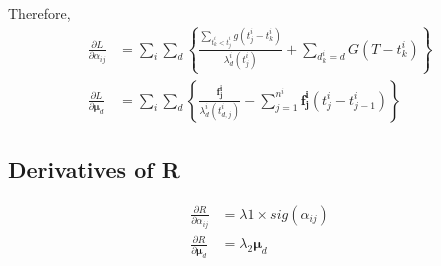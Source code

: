 \documentclass{article}
\begin{document}
			\newpage
			Therefore,
			\begin{equation}
			\begin{aligned}
			\frac{\partial L}{\partial\alpha_{ij}} &= \sum_{i} \sum_{d} \left\{\frac{\sum_{t_{k}^{i}<t_{j}^{i}} g\left(t_{j}^{i}-t_{k}^{i}\right)}{\lambda_{d}^{i}\left(t_{j}^{i}\right)} + \sum_{d^i_k = d}G\left(T - t^i_k\right) \right\} \\
			\frac{\partial L}{\partial\boldsymbol{\mu}_d} &=\sum_{i} \sum_{d}\left\{\frac{\boldsymbol{f^i_j}}{\lambda^i_d(t^i_{d,j})  }- \sum_{j=1}^{n^i} \boldsymbol{f^i_j }\left(t^i_j - t^i_{j-1}\right)  \right\}
			\end{aligned}
			\end{equation}
		
		\subsection{Derivatives of R}
			
			\begin{equation}
				\begin{aligned}
					\frac{\partial R}{\partial \alpha_{ij}} &= \lambda 1 \times sig\left(\alpha_{ij}\right) \\
					\frac{\partial R}{\partial \boldsymbol{\mu}_d} &= \lambda_{2} \boldsymbol{\mu}_d
				\end{aligned}
			\end{equation}
			
		
\end{document}
